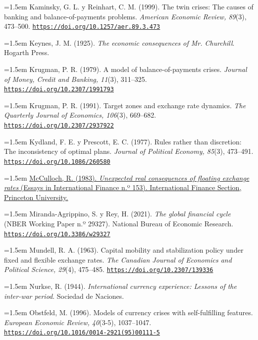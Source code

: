 \documentclass[10pt,a4paper]{article}
\begin{document}
\noindent\hangindent=1.5em Kaminsky, G. L. y Reinhart, C. M. (1999). The twin crises: The causes of banking and balance-of-payments problems. \textit{American Economic Review, 89}(3), 473--500. \href{https://doi.org/10.1257/aer.89.3.473}{\nolinkurl{https://doi.org/10.1257/aer.89.3.473}}

\noindent\hangindent=1.5em Keynes, J. M. (1925). \textit{The economic consequences of Mr. Churchill}. Hogarth Press.

\noindent\hangindent=1.5em Krugman, P. R. (1979). A model of balance-of-payments crises. \textit{Journal of Money, Credit and Banking, 11}(3), 311--325. \href{https://doi.org/10.2307/1991793}{\nolinkurl{https://doi.org/10.2307/1991793}}

\noindent\hangindent=1.5em Krugman, P. R. (1991). Target zones and exchange rate dynamics. \textit{The Quarterly Journal of Economics, 106}(3), 669--682. \href{https://doi.org/10.2307/2937922}{\nolinkurl{https://doi.org/10.2307/2937922}}

\noindent\hangindent=1.5em Kydland, F. E. y Prescott, E. C. (1977). Rules rather than discretion: The inconsistency of optimal plans. \textit{Journal of Political Economy, 85}(3), 473--491. \href{https://doi.org/10.1086/260580}{\nolinkurl{https://doi.org/10.1086/260580}}

\noindent\hangindent=1.5em \href{https://ies.princeton.edu/pdf/E153.pdf}{McCulloch, R. (1983). \textit{Unexpected real consequences of floating exchange rates} (Essays in International Finance n.º 153). International Finance Section, Princeton University.}

\noindent\hangindent=1.5em Miranda-Agrippino, S. y Rey, H. (2021). \textit{The global financial cycle} (NBER Working Paper n.º 29327). National Bureau of Economic Research. \href{https://doi.org/10.3386/w29327}{\nolinkurl{https://doi.org/10.3386/w29327}}

\noindent\hangindent=1.5em Mundell, R. A. (1963). Capital mobility and stabilization policy under fixed and flexible exchange rates. \textit{The Canadian Journal of Economics and Political Science, 29}(4), 475--485. \href{https://doi.org/10.2307/139336}{\nolinkurl{https://doi.org/10.2307/139336}}

\noindent\hangindent=1.5em Nurkse, R. (1944). \textit{International currency experience: Lessons of the inter-war period}. Sociedad de Naciones.

\noindent\hangindent=1.5em Obstfeld, M. (1996). Models of currency crises with self-fulfilling features. \textit{European Economic Review, 40}(3-5), 1037--1047. \href{https://doi.org/10.1016/0014-2921(95)00111-5}{\nolinkurl{https://doi.org/10.1016/0014-2921(95)00111-5}}
\end{document}
